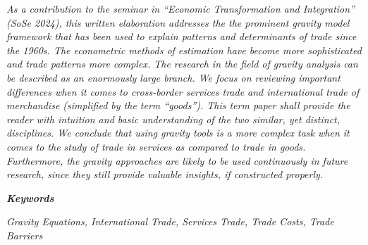 \documentclass[../Main.tex]{subfiles}
\begin{document}
\vspace{1.5cm}

\textit{As a contribution to the seminar in \enquote{Economic Transformation and Integration} (SoSe 2024), this written elaboration addresses the the prominent gravity model framework that has been used to explain patterns and determinants of trade since the 1960s. The econometric methods of estimation have become more sophisticated and trade patterns more complex. The research in the field of gravity analysis can be described as an enormously large branch. We focus on reviewing important differences when it comes to cross-border services trade and international trade of merchandise (simplified by the term \enquote{goods}). This term paper shall provide the reader with intuition and basic understanding of the two similar, yet distinct, disciplines. We conclude that using gravity tools is a more complex task when it comes to the study of trade in services as compared to trade in goods. Furthermore, the gravity approaches are likely to be used continuously in future research, since they still provide valuable insights, if constructed properly.}


\par\vspace*{\fill} %


\hspace{-0.925cm} \large\textbf{\textit{Keywords}} 

\vspace{0.3cm}

\hspace{-0.925cm} \textit{Gravity Equations, International Trade, Services Trade, Trade Costs, Trade Barriers} %

\biblio %
\end{document}

